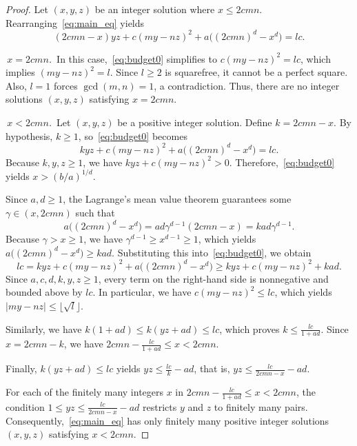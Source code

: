 \documentclass[10pt,a4paper]{amsart}
\begin{document}
\begin{proof}
Let $(x,y,z)$ be an integer solution where $x \le 2cmn$. Rearranging~\eqref{eq:main_eq} yields
\begin{equation}\label{eq:budget0}
(2cmn - x) yz + c(my-nz)^2 + a\bigl((2cmn)^d - x^d\bigr) = l c.
\end{equation}

\smallskip
{} \,\textit{$x = 2cmn$.}\,
In this case,~\eqref{eq:budget0} simplifies to $c(my-nz)^2 = l c $, which implies $(my-nz)^2 = l$. Since $l\ge 2$ is squarefree, it cannot be a perfect square. Also, $l=1$ forces $\gcd(m,n)=1$, a contradiction. Thus, there are no integer solutions $(x,y,z)$ satisfying $x = 2cmn$.

\smallskip
{} \,\textit{$x < 2cmn$.}\,
Let $(x,y,z)$ be a positive integer solution. Define $k = 2cmn - x$. By hypothesis, $k \ge 1$, so~\eqref{eq:budget0} becomes
\[
k yz + c(my-nz)^2 + a\bigl((2cmn)^d - x^d\bigr) = l c.
\]
Because $k ,y,z \ge 1$, we have $k yz + c(my-nz)^2 > 0$. Therefore,~\eqref{eq:budget0} yields $x > (b/a)^{1/d}$.


Since $a,d \ge 1$, the Lagrange's mean value theorem guarantees some $\gamma \in (x, 2cmn)$ such that
\[
a\bigl((2cmn)^d - x^d\bigr) = ad\gamma^{d-1}(2cmn-x) = kad\gamma^{d-1}.
\]
Because $\gamma > x \ge 1$, we have $\gamma^{d-1} \ge x^{d-1} \ge 1$, which yields $a\bigl((2cmn)^d - x^d\bigr) \ge kad$. Substituting this into~\eqref{eq:budget0}, we obtain
\[
l c = k yz + c(my-nz)^2 + a\bigl((2cmn)^d - x^d\bigr) \ge k yz + c(my-nz)^2 + kad.
\]
Since $a,c,d,k,y, z \ge 1$, every term on the right-hand side is nonnegative and bounded above by $l c$. In particular, we have $c(my-nz)^2 \le l c$, which yields $|my-nz| \le \big\lfloor \sqrt{l} \big\rfloor$. 

Similarly, we have $k(1+ad) \le k(yz+ad) \le l c$, which proves
$k \le \frac{l c}{1+ad}$. Since $x = 2cmn - k$, we have $2cmn - \frac{l c}{1+ad} \le x < 2cmn$.

Finally, $k(yz+ad) \le l c$ yields $yz \le \frac{l c}{k} - ad$, that is, $yz \le \frac{l c}{2cmn - x} - ad$.

For each of the finitely many integers $x$ in $2cmn - \frac{l c}{1+ad} \le x < 2cmn$, the condition $1\le yz \le \frac{l c}{2cmn - x} - ad$ restricts $y$ and $z$ to finitely many pairs. Consequently,~\eqref{eq:main_eq} has only finitely many positive integer solutions $(x,y,z)$ satisfying $x < 2cmn$.
\end{proof}
\end{document}
